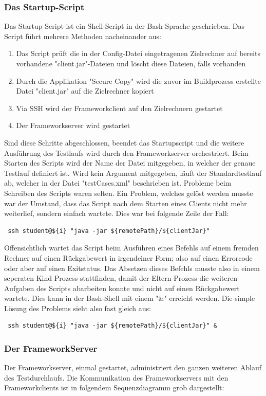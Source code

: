 \subsubsection{Das Startup-Script}
\label{sec:startupScript}
Das  Startup-Script ist ein Shell-Script in der Bash-Sprache geschrieben. Das Script führt mehrere Methoden nacheinander aus:
\begin{enumerate}
\item Das Script prüft die in der Config-Datei eingetragenen Zielrechner auf bereits vorhandene "client.jar"-Dateien und löscht diese Dateien, falls vorhanden
\item Durch die Applikation "Secure Copy" wird die zuvor im Buildprozess erstellte Datei "client.jar" auf die Zielrechner kopiert
\item Via SSH wird der Frameworkclient auf den Zielrechnern gestartet
\item Der Frameworkserver wird gestartet
\end{enumerate}
Sind diese Schritte abgeschlossen, beendet das Startupscript und die weitere Ausführung des Testlaufs wird durch den Frameworkserver orchestriert.
Beim Starten des Scripts wird der Name der Datei mitgegeben, in welcher der genaue Testlauf definiert ist. Wird kein Argument mitgegeben, läuft der Standardtestlauf ab, welcher in der Datei "testCases.xml" beschrieben ist.
Probleme beim Schreiben des Scripts waren selten. Ein Problem, welches gelöst werden musste war der Umstand, dass das Script nach dem Starten eines Clients nicht mehr weiterlief, sondern einfach wartete. Dies war bei folgende Zeile der Fall:
\begin{lstlisting}	
 ssh student@${i} "java -jar ${remotePath}/${clientJar}"
\end{lstlisting}	
Offensichtlich wartet das Script beim Ausführen eines Befehls auf einem fremden Rechner auf einen Rückgabewert in irgendeiner Form; also auf einen Errorcode oder aber auf einen Exitstatus. Das Absetzen dieses Befehls musste also in einem seperaten Kind-Prozess stattfinden, damit der Eltern-Prozess die weiteren Aufgaben des Scripts abarbeiten konnte und nicht auf einen Rückgabewert wartete. Dies kann in der Bash-Shell mit einem "\&" erreicht werden. Die simple Lösung des Problems sieht also fast gleich aus:
\begin{lstlisting}
 ssh student@${i} "java -jar ${remotePath}/${clientJar}" &
\end{lstlisting}

\subsubsection{Der FrameworkServer}
\label{sec:frameWorkServer}
Der Frameworkserver, einmal gestartet, administriert den ganzen weiteren Ablauf des Testdurchlaufs. Die Kommunikation des Frameworkservers mit den Frameworkclients ist in folgendem Sequenzdiagramm grob dargestellt:

